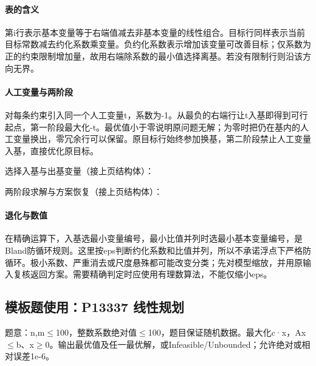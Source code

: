 

\paragraph{表的含义} 第i行表示基本变量等于右端值减去非基本变量的线性组合。目标行同样表示当前目标常数减去约化系数乘变量。负约化系数表示增加该变量可改善目标；仅系数为正的约束限制增加量，故用右端除系数的最小值选择离基。若没有限制行则沿该方向无界。

\paragraph{人工变量与两阶段} 对每条约束引入同一个人工变量t，系数为-1。从最负的右端行让t入基即得到可行起点，第一阶段最大化-t。最优值小于零说明原问题无解；为零时把仍在基内的人工变量换出，零冗余行可以保留。原目标行始终参加换基，第二阶段禁止人工变量入基，直接优化原目标。

\newpage

选择入基与出基变量（接上页结构体）：



\newpage

两阶段求解与方案恢复（接上页结构体）：



\paragraph{退化与数值} 在精确运算下，入基选最小变量编号，最小比值并列时选最小基本变量编号，是Bland防循环规则。这里按eps判断约化系数和比值并列，所以不承诺浮点下严格防循环。极小系数、严重消去或尺度悬殊都可能改变分类；先对模型缩放，并用原输入复核返回方案。需要精确判定时应使用有理数算法，不能仅缩小eps。

\newpage

\Needspace{446pt}

\subsection*{模板题使用：P13337 线性规划}

\label{usage-example-397}

题意：n,m$\le$100，整数系数绝对值$\le$100，题目保证随机数据。最大化c·x，Ax$\le$b、x$\ge$0。输出最优值及任一最优解，或Infeasible/Unbounded；允许绝对或相对误差1e-6。

